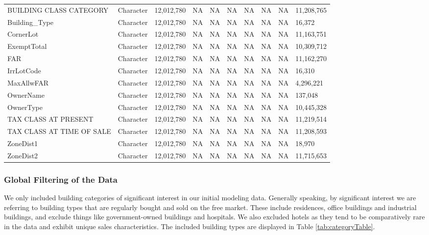 \documentclass[12pt,]{article}
\begin{document}
\begin{table}
{\begin{tabular}[t]{llllllllll}
\addlinespace
BUILDING CLASS CATEGORY & Character & 12,012,780 & NA & NA & NA & NA & NA & NA & 11,208,765\\
Building\_Type & Character & 12,012,780 & NA & NA & NA & NA & NA & NA & 16,372\\
CornerLot & Character & 12,012,780 & NA & NA & NA & NA & NA & NA & 11,163,751\\
ExemptTotal & Character & 12,012,780 & NA & NA & NA & NA & NA & NA & 10,309,712\\
FAR & Character & 12,012,780 & NA & NA & NA & NA & NA & NA & 11,162,270\\
\addlinespace
IrrLotCode & Character & 12,012,780 & NA & NA & NA & NA & NA & NA & 16,310\\
MaxAllwFAR & Character & 12,012,780 & NA & NA & NA & NA & NA & NA & 4,296,221\\
OwnerName & Character & 12,012,780 & NA & NA & NA & NA & NA & NA & 137,048\\
OwnerType & Character & 12,012,780 & NA & NA & NA & NA & NA & NA & 10,445,328\\
TAX CLASS AT PRESENT & Character & 12,012,780 & NA & NA & NA & NA & NA & NA & 11,219,514\\
\addlinespace
TAX CLASS AT TIME OF SALE & Character & 12,012,780 & NA & NA & NA & NA & NA & NA & 11,208,593\\
ZoneDist1 & Character & 12,012,780 & NA & NA & NA & NA & NA & NA & 18,970\\
ZoneDist2 & Character & 12,012,780 & NA & NA & NA & NA & NA & NA & 11,715,653\\
\bottomrule
\end{tabular}}
\end{table}

\hypertarget{global-filtering-of-the-data}{%
\subsubsection{Global Filtering of the
Data}\label{global-filtering-of-the-data}}

We only included building categories of significant interest in our
initial modeling data. Generally speaking, by significant interest we
are referring to building types that are regularly bought and sold on
the free market. These include residences, office buildings and
industrial buildings, and exclude things like government-owned buildings
and hospitals. We also excluded hotels as they tend to be comparatively
rare in the data and exhibit unique sales characteristics. The included
building types are displayed in Table \ref{tab:categoryTable}.
\end{document}
